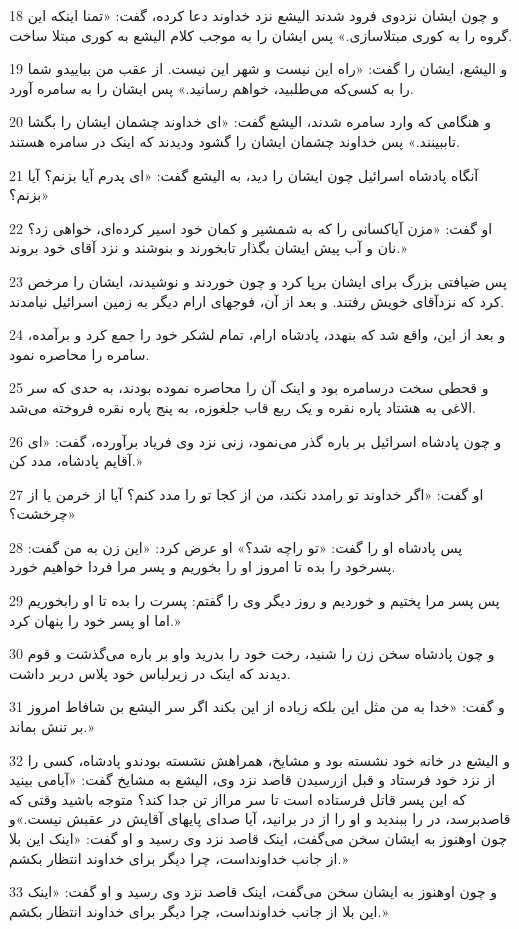 \par 18 و چون ایشان نزدوی فرود شدند الیشع نزد خداوند دعا کرده، گفت: «تمنا اینکه این گروه را به کوری مبتلاسازی.» پس ایشان را به موجب کلام الیشع به کوری مبتلا ساخت.
\par 19 و الیشع، ایشان را گفت: «راه این نیست و شهر این نیست. از عقب من بیاییدو شما را به کسی‌که می‌طلبید، خواهم رسانید.» پس ایشان را به سامره آورد.
\par 20 و هنگامی که وارد سامره شدند، الیشع گفت: «ای خداوند چشمان ایشان را بگشا تاببینند.» پس خداوند چشمان ایشان را گشود ودیدند که اینک در سامره هستند.
\par 21 آنگاه پادشاه اسرائیل چون ایشان را دید، به الیشع گفت: «ای پدرم آیا بزنم؟ آیا بزنم؟»
\par 22 او گفت: «مزن آیاکسانی را که به شمشیر و کمان خود اسیر کرده‌ای، خواهی زد؟ نان و آب پیش ایشان بگذار تابخورند و بنوشند و نزد آقای خود بروند.»
\par 23 پس ضیافتی بزرگ برای ایشان برپا کرد و چون خوردند و نوشیدند، ایشان را مرخص کرد که نزدآقای خویش رفتند. و بعد از آن، فوجهای ارام دیگر به زمین اسرائیل نیامدند.
\par 24 و بعد از این، واقع شد که بنهدد، پادشاه ارام، تمام لشکر خود را جمع کرد و برآمده، سامره را محاصره نمود.
\par 25 و قحطی سخت درسامره بود و اینک آن را محاصره نموده بودند، به حدی که سر الاغی به هشتاد پاره نقره و یک ربع قاب جلغوزه، به پنج پاره نقره فروخته می‌شد.
\par 26 و چون پادشاه اسرائیل بر باره گذر می‌نمود، زنی نزد وی فریاد برآورده، گفت: «ای آقایم پادشاه، مدد کن.»
\par 27 او گفت: «اگر خداوند تو رامدد نکند، من از کجا تو را مدد کنم؟ آیا از خرمن یا از چرخشت؟»
\par 28 پس پادشاه او را گفت: «تو راچه شد؟» او عرض کرد: «این زن به من گفت: پسرخود را بده تا امروز او را بخوریم و پسر مرا فردا خواهیم خورد.
\par 29 پس پسر مرا پختیم و خوردیم و روز دیگر وی را گفتم: پسرت را بده تا او رابخوریم اما او پسر خود را پنهان کرد.»
\par 30 و چون پادشاه سخن زن را شنید، رخت خود را بدرید واو بر باره می‌گذشت و قوم دیدند که اینک در زیرلباس خود پلاس دربر داشت.
\par 31 و گفت: «خدا به من مثل این بلکه زیاده از این بکند اگر سر الیشع بن شافاط امروز بر تنش بماند.»
\par 32 و الیشع در خانه خود نشسته بود و مشایخ، همراهش نشسته بودندو پادشاه، کسی را از نزد خود فرستاد و قبل ازرسیدن قاصد نزد وی، الیشع به مشایخ گفت: «آیامی بینید که این پسر قاتل فرستاده است تا سر مرااز تن جدا کند؟ متوجه باشید وقتی که قاصدبرسد، در را ببندید و او را از در برانید، آیا صدای پایهای آقایش در عقبش نیست.»و چون اوهنوز به ایشان سخن می‌گفت، اینک قاصد نزد وی رسید و او گفت: «اینک این بلا از جانب خداونداست، چرا دیگر برای خداوند انتظار بکشم.»
\par 33 و چون اوهنوز به ایشان سخن می‌گفت، اینک قاصد نزد وی رسید و او گفت: «اینک این بلا از جانب خداونداست، چرا دیگر برای خداوند انتظار بکشم.»
 
